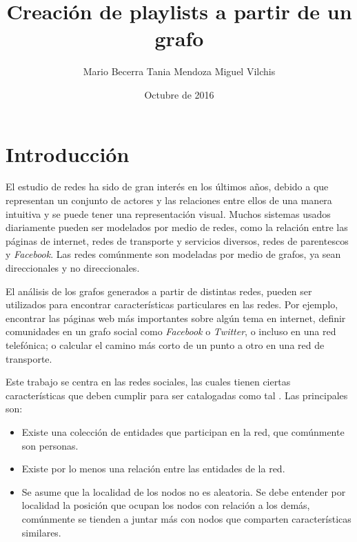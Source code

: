 \documentclass{article}
\begin{document}
\title{\vspace{-1cm}Creación de playlists a partir de un grafo}

\author{Mario Becerra \qquad Tania Mendoza \qquad Miguel Vilchis}

\date{Octubre de 2016}

\maketitle

\section{Introducción}

El estudio de redes ha sido de gran interés en los últimos años, debido a que representan un conjunto de actores y las relaciones entre ellos de una manera intuitiva y se puede tener una representación visual. Muchos sistemas usados diariamente pueden ser modelados por medio de redes, como la relación entre las páginas de internet, redes de transporte y servicios diversos, redes de parentescos y \textit{Facebook}.  Las redes comúnmente son modeladas por medio de grafos, ya sean direccionales y no direccionales. 

El análisis de los grafos generados a partir de distintas redes, pueden ser utilizados para encontrar características particulares en las redes. Por ejemplo, encontrar las páginas web más importantes sobre algún tema en internet, definir comunidades en un grafo social como \textit{Facebook} o \textit{Twitter}, o incluso en una red telefónica; o calcular el camino más corto de un punto a otro en una red de transporte.

Este trabajo se centra en las redes sociales, las cuales tienen ciertas características que deben cumplir para ser catalogadas como tal \cite{leskovec_mining_2014}. Las principales son:

\begin{itemize}
\item Existe una colección de entidades que participan en la red, que comúnmente son personas. 
\item Existe por lo menos una relación entre las entidades de la red. 
\item Se asume que la localidad de los nodos no es aleatoria. Se debe entender por localidad la posición que ocupan los nodos con relación a los demás, comúnmente se tienden a juntar más con nodos que comparten características similares.
\end{itemize}
\end{document}
